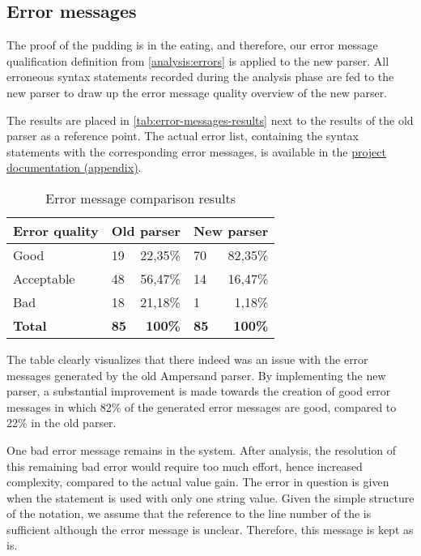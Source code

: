 
\subsection{Error messages}
\label{tests:errors}
The proof of the pudding is in the eating, and therefore, our error message qualification definition from \autoref{analysis:errors} is applied to the new parser.
All erroneous syntax statements recorded during the analysis phase are fed to the new parser to draw up the error message quality overview of the new parser.

The results are placed in \autoref{tab:error-messages-results} next to the results of the old parser as a reference point.
The actual error list, containing the syntax statements with the corresponding error messages, is available in the \hyperref[app:docs]{project documentation (appendix)}.

\begin{table}[h]
  \centering\small
	\begin{tabular}{|l|lr|lr|}\hline
		\rowcolor[HTML]{DDDDDD}
    \textbf{Error quality}  & \multicolumn{2}{|c|}{\textbf{Old parser}} & \multicolumn{2}{|c|}{\textbf{New parser}} \\\hline\hline
		Good           & 19          & 22,35\%          & 70          & 82,35\%          \\\hline
		Acceptable        & 48          & 56,47\%          & 14          & 16,47\%          \\\hline
		Bad            & 18          & 21,18\%          & 1           &  1,18\%          \\\hline
		\rowcolor[HTML]{DDDDDD}\hline\hline
		\textbf{Total} & \textbf{85} & \textbf{100\%} & \textbf{85} & \textbf{100\%} \\\hline
	\end{tabular}
  \caption{Error message comparison results}
  \label{tab:error-messages-results}
\end{table}

The table clearly visualizes that there indeed was an issue with the error messages generated by the old Ampersand parser.
By implementing the new parser, a substantial improvement is made towards the creation of good error messages in which 82\% of the generated error messages are good, compared to 22\% in the old parser.

One bad error message remains in the system.
After analysis, the resolution of this remaining bad error would require too much effort, hence increased complexity, compared to the actual value gain.
The error in question is given when the  statement is used with only one string value. 
Given the simple structure of the notation, we assume that the reference to the line number of the  is sufficient although the error message is unclear.
Therefore, this message is kept as is.

